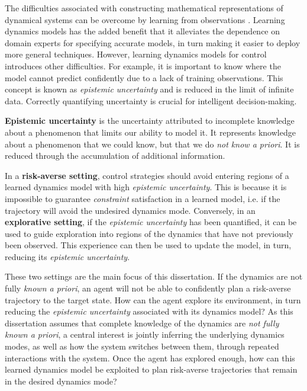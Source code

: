 \documentclass{mimosis-class/mimosis}
\numberwithin{equation}{chapter}
\begin{document}
The difficulties associated with constructing mathematical representations of dynamical systems
can be overcome by learning from observations \citep{ljungSystem1999}.
Learning dynamics models has the added benefit that it
alleviates the dependence on domain experts for specifying accurate models, in turn making it easier to
deploy more general techniques.
However, learning dynamics models for control introduces other difficulties.
For example, it is important to know
where the model cannot predict confidently due to a lack of training observations.
This concept is known as \emph{epistemic uncertainty} and is reduced in the limit of infinite data.
Correctly quantifying uncertainty is crucial for intelligent decision-making.
\begin{myquote}
\textbf{Epistemic uncertainty}
is the uncertainty attributed to incomplete knowledge about a phenomenon that limits our ability to model it.
It represents knowledge about a phenomenon that we could know, but that we do \textit{not know a priori}.
It is reduced through the accumulation of additional information.
\end{myquote}

In a \textbf{risk-averse setting}, control strategies should avoid entering regions of
a learned dynamics model with high \emph{epistemic uncertainty}.
This is because it is impossible to guarantee \emph{constraint} satisfaction in a learned model, i.e.
if the trajectory will avoid the undesired dynamics mode.
Conversely, in an \textbf{explorative setting},
if the \emph{epistemic uncertainty} has been quantified, it can be used to guide exploration into
regions of the dynamics that have not previously been observed.
This experience can then be used to update the model, in turn, reducing its \emph{epistemic uncertainty}.

These two settings are the main focus of this dissertation.
If the dynamics are not fully \emph{known a priori}, an agent will not be able to confidently plan a
risk-averse trajectory to the target state.
How can the agent explore its environment, in turn reducing the \emph{epistemic uncertainty}
associated with its dynamics model?
As this dissertation assumes that complete knowledge of the dynamics are \emph{not fully known a priori},
a central interest is jointly inferring the underlying dynamics modes, as well as how the system switches
between them, through repeated interactions with the system.
Once the agent has explored enough, how can this learned dynamics model be exploited to plan risk-averse trajectories
that remain in the desired dynamics mode?
\end{document}
